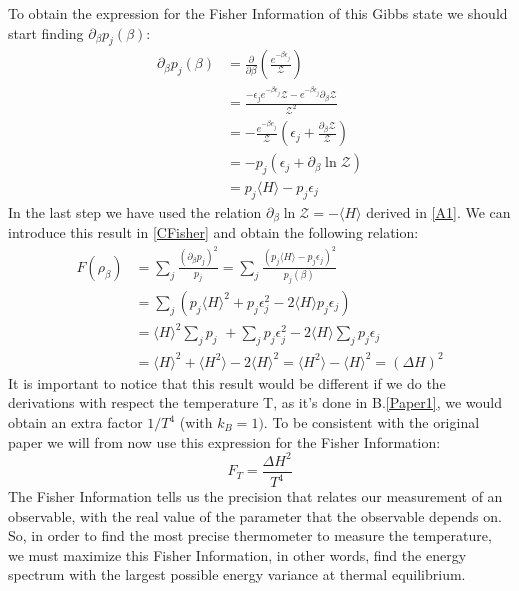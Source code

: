 \documentclass{article}
\begin{document}
To obtain the expression for the Fisher Information of this Gibbs state we should start finding $\partial_\beta p_j(\beta)$:
\begin{align*}
    \partial_\beta p_j (\beta) &= \frac{\partial}{\partial\beta}(\frac{e^{-\beta\epsilon_j}}{\mathcal{Z}})\\
    &= \frac{-\epsilon_je^{-\beta\epsilon_j}\mathcal{Z} - e^{-\beta\epsilon_j}\partial_\beta\mathcal{Z}}{\mathcal{Z}^2}\\
    &= -\frac{e^{-\beta e_j}}{\mathcal{Z}}(\epsilon_j+\frac{\partial_\beta\mathcal{Z}}{\mathcal{Z}})\\
    &=-p_j(\epsilon_j+\partial_\beta \ln{\mathcal{Z}})\\
    &=p_j\langle H \rangle - p_j\epsilon_j
\end{align*}
In the last step we have used the relation $\partial_\beta \ln{\mathcal{Z}} = -\langle H \rangle$ derived in \ref{A1}. We can introduce this result in \ref{CFisher} and obtain the following relation:
\begin{align*}
    F(\rho_\beta) &= \sum_j \frac{(\partial_\beta p_j)^2}{p_j} = \sum_j \frac{(p_j\langle H \rangle - p_j\epsilon_j)^2}{p_j(\beta)}\\
    &=\sum_j\left( p_j\langle H \rangle^2 + p_j\epsilon_j^2 -2\langle H \rangle p_j\epsilon_j \right)\\
    &=\langle H \rangle^2\sum_j p_j\,\,+\sum_j p_j\epsilon_j^2 -2\langle H \rangle\sum_j p_j\epsilon_j\\
    &=\langle H \rangle^2 +\langle H^2 \rangle - 2\langle H \rangle^2=\langle H^2\rangle - \langle H \rangle^2 = (\Delta H)^2
\end{align*}
It is important to notice that this result would be different if we do the derivations with respect the temperature T, as it's done in B.\ref{Paper1}, we would obtain an extra factor $1/T^4$ (with $k_B=1)$. To be consistent with the original paper we will from now use this expression for the Fisher Information:
\begin{equation}
\label{F(T)}
    F_T = \frac{\Delta H^2}{T^4}
\end{equation}
The Fisher Information tells us the precision that relates our measurement of an observable, with the real value of the parameter that the observable depends on. So, in order to find the most precise thermometer to measure the temperature, we must maximize this Fisher Information, in other words, find the energy spectrum with the largest possible energy variance at thermal equilibrium.\par
\end{document}
